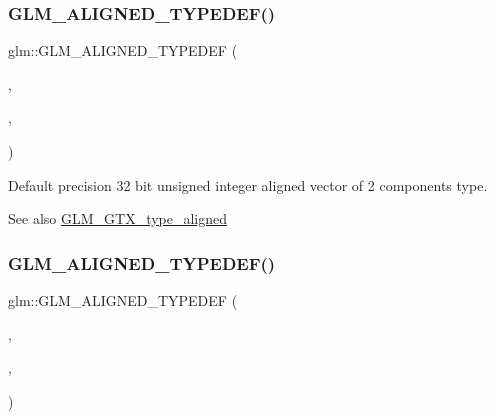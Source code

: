 \subsubsection{\texorpdfstring{G\+L\+M\+\_\+\+A\+L\+I\+G\+N\+E\+D\+\_\+\+T\+Y\+P\+E\+D\+E\+F()}{GLM\_ALIGNED\_TYPEDEF()}\hspace{0.1cm}{\footnotesize\ttfamily [130/209]}}
{\footnotesize\ttfamily glm\+::\+G\+L\+M\+\_\+\+A\+L\+I\+G\+N\+E\+D\+\_\+\+T\+Y\+P\+E\+D\+EF (\begin{DoxyParamCaption}\item[{\hyperlink{group__gtc__type__precision_gad3a81c0d5a6941bb9ffdc9fa8611b426}{u32vec2}}]{,  }\item[{aligned\+\_\+u32vec2}]{,  }\item[{8}]{ }\end{DoxyParamCaption})}

Default precision 32 bit unsigned integer aligned vector of 2 components type. \begin{DoxySeeAlso}{See also}
\hyperlink{group__gtx__type__aligned}{G\+L\+M\+\_\+\+G\+T\+X\+\_\+type\+\_\+aligned} 
\end{DoxySeeAlso}
\mbox{\label{group__gtx__type__aligned_ga0019500abbfa9c66eff61ca75eaaed94}} 
\subsubsection{\texorpdfstring{G\+L\+M\+\_\+\+A\+L\+I\+G\+N\+E\+D\+\_\+\+T\+Y\+P\+E\+D\+E\+F()}{GLM\_ALIGNED\_TYPEDEF()}\hspace{0.1cm}{\footnotesize\ttfamily [131/209]}}
{\footnotesize\ttfamily glm\+::\+G\+L\+M\+\_\+\+A\+L\+I\+G\+N\+E\+D\+\_\+\+T\+Y\+P\+E\+D\+EF (\begin{DoxyParamCaption}\item[{\hyperlink{group__gtc__type__precision_ga16b26751ba6b83c8a0226b9834d73fdc}{u32vec3}}]{,  }\item[{aligned\+\_\+u32vec3}]{,  }\item[{16}]{ }\end{DoxyParamCaption})}

